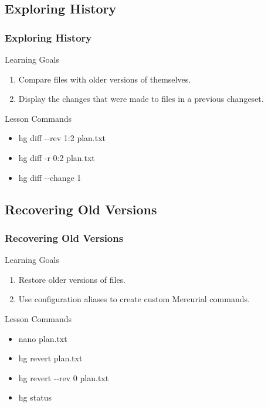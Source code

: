 \documentclass{beamer}
\renewcommand{\dh}{{-}{-}}
\begin{document}
\subsection*{Exploring History}
\begin{frame}
\frametitle{Exploring History}
\begin{block}{Learning Goals}
\begin{enumerate}
\item Compare files with older versions of themselves.
\item Display the changes that were made to files in a previous changeset.
\end{enumerate}
\end{block}
\begin{block}{Lesson Commands}
\begin{multicols}{2}
\begin{itemize}
\item hg diff \dh rev 1:2 plan.txt
\item hg diff -r 0:2 plan.txt
\item hg diff \dh change 1
\end{itemize}
\end{multicols}
\end{block}
\end{frame}


\subsection*{Recovering Old Versions}
\begin{frame}
\frametitle{Recovering Old Versions}
\begin{block}{Learning Goals}
\begin{enumerate}
\item Restore older versions of files.
\item Use configuration aliases to create custom Mercurial commands.
\end{enumerate}
\end{block}
\begin{block}{Lesson Commands}
\begin{multicols}{2}
\begin{itemize}
\item nano plan.txt
\item hg revert plan.txt
\item hg revert \dh rev 0 plan.txt
\item hg status
\end{itemize}
\end{multicols}
\end{block}
\end{frame}
\end{document}
